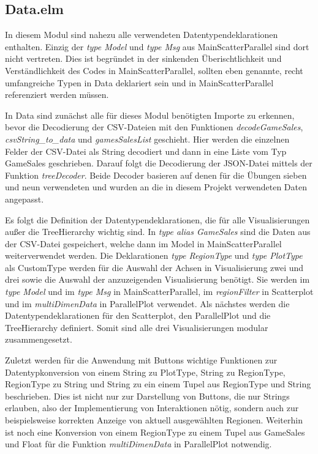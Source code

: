 \documentclass[usegeometry=true]{scrartcl}
\begin{document}
\subsection{Data.elm}
In diesem Modul sind nahezu alle verwendeten Datentypendeklarationen enthalten. Einzig der \textit{type Model} und \textit{type Msg} aus MainScatterParallel sind dort nicht vertreten. 
Dies ist begründet in der sinkenden Überischtlichkeit und Verständlichkeit des Codes in MainScatterParallel, sollten eben genannte, recht umfangreiche Typen in Data deklariert sein und in MainScatterParallel referenziert werden müssen.

In Data sind zunächst alle für dieses Modul benötigten Importe zu erkennen, bevor die Decodierung der CSV-Dateien mit den Funktionen \textit{decodeGameSales}, \textit{csvString\_to\_data} und \textit{gamesSalesList} geschieht. 
Hier werden die einzelnen Felder der CSV-Datei als String decodiert und dann in eine Liste vom Typ GameSales geschrieben.
Darauf folgt die Decodierung der JSON-Datei mittels der Funktion \textit{treeDecoder}.
Beide Decoder basieren auf denen für die Übungen sieben und neun verwendeten und wurden an die in diesem Projekt verwendeten Daten angepasst.

Es folgt die Definition der Datentypendeklarationen, die für alle Visualisierungen außer die TreeHierarchy wichtig sind. 
In \textit{type alias GameSales} sind die Daten aus der CSV-Datei gespeichert, welche dann im Model in MainScatterParallel weiterverwendet werden. 
Die Deklarationen \textit{type RegionType} und \textit{type PlotType} als CustomType werden für die Auswahl der Achsen in Visualisierung zwei und drei sowie die Auswahl der anzuzeigenden Visualisierung benötigt.
Sie werden im \textit{type Model} und im \textit{type Msg} in MainScatterParallel, im \textit{regionFilter} in Scatterplot und im \textit{multiDimenData} in ParallelPlot verwendet. 
Als nächstes werden die Datentypendeklarationen für den Scatterplot, den ParallelPlot und die TreeHierarchy definiert. 
Somit sind alle drei Visualisierungen modular zusammengesetzt.

Zuletzt werden für die Anwendung mit Buttons wichtige Funktionen zur Datentypkonversion von einem String zu PlotType, String zu RegionType, RegionType zu String und String zu ein einem Tupel aus RegionType und String beschrieben. 
Dies ist nicht nur zur Darstellung von Buttons, die nur Strings erlauben, also der Implementierung von Interaktionen nötig, sondern auch zur beispielsweise korrekten Anzeige von aktuell ausgewählten Regionen.
Weiterhin ist noch eine Konversion von einem RegionType zu einem Tupel aus GameSales und Float für die Funktion \textit{multiDimenData} in ParallelPlot notwendig.
\end{document}
